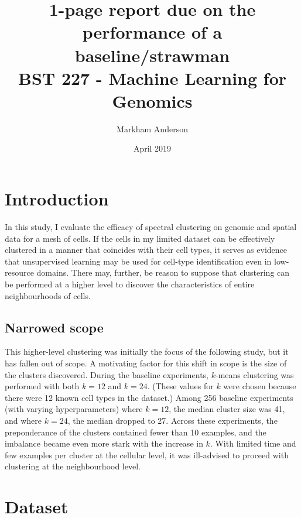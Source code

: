 \documentclass{article}
\title{1-page report due on the performance of a baseline/strawman \\
\large BST 227 - Machine Learning for Genomics}
\author{Markham Anderson}
\date{April 2019}
\begin{document}
\maketitle
\small

\section{Introduction}

In this study, I evaluate the efficacy of spectral clustering on genomic and spatial data for a mesh of cells. If the cells in my limited dataset can be effectively clustered in a manner that coincides with their cell types, it serves as evidence that unsupervised learning may be used for cell-type identification even in low-resource domains. There may, further, be reason to suppose that clustering can be performed at a higher level to discover the characteristics of entire neighbourhoods of cells.


\subsection{Narrowed scope}

This higher-level clustering was initially the focus of the following study, but it has fallen out of scope. A motivating factor for this shift in scope is the size of the clusters discovered. During the baseline experiments, $k$-means clustering was performed with both $k=12$ and $k=24$. (These values for $k$ were chosen because there were 12 known cell types in the dataset.) Among 256 baseline experiments (with varying hyperparameters) where $k = 12$, the median cluster size was 41, and where $k = 24$, the median dropped to 27. Across these experiments, the preponderance of the clusters contained fewer than 10 examples, and the imbalance became even more stark with the increase in $k$. With limited time and few examples per cluster at the cellular level, it was ill-advised to proceed with clustering at the neighbourhood level.


\section{Dataset}
\end{document}
